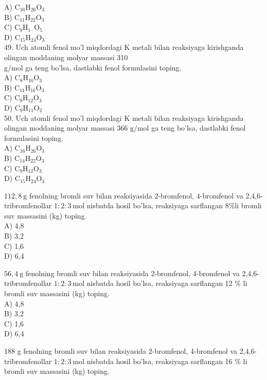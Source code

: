 A) $\mathrm{C}_{16} \mathrm{H}_{26} \mathrm{O}_{3}$\\
B) $\mathrm{C}_{11} \mathrm{H}_{22} \mathrm{O}_{3}$\\
C) $\mathrm{C}_{9} \mathrm{H}_{1 \cdot} \mathrm{O}_{5}$\\
D) $\mathrm{C}_{15} \mathrm{H}_{24} \mathrm{O}_{3}$\\
49. Uch atomli fenol mo'l miqdordagi K metali bilan reaksiyaga kirishganda olingan moddaning molyar massasi 310\\
g/mol ga teng bo'lsa, dastlabki fenol formulasini toping.\\
A) $\mathrm{C}_{8} \mathrm{H}_{10} \mathrm{O}_{3}$\\
B) $\mathrm{C}_{11} \mathrm{H}_{16} \mathrm{O}_{3}$\\
C) $\mathrm{C}_{9} \mathrm{H}_{12} \mathrm{O}_{3}$\\
D) $\mathrm{C}_{9} \mathrm{H}_{11} \mathrm{O}_{2}$\\
50. Uch atomli fenol mo'l miqdordagi K metali bilan reaksiyaga kirishganda olingan moddaning molyar massasi 366 $\mathrm{g} / \mathrm{mol}$ ga teng bo'lsa, dastlabki fenol formulasini toping.\\
A) $\mathrm{C}_{16} \mathrm{H}_{26} \mathrm{O}_{3}$\\
B) $\mathrm{C}_{14} \mathrm{H}_{22} \mathrm{O}_{3}$\\
C) $\mathrm{C}_{9} \mathrm{H}_{12} \mathrm{O}_{3}$\\
D) $\mathrm{C}_{15} \mathrm{H}_{24} \mathrm{O}_{3}$
  \item $112,8 \mathrm{~g}$ fenolning bromli suv bilan reaksiyasida 2-bromfenol, 4-bromfenol va 2,4,6-tribromfenollar $1: 2: 3 \mathrm{~mol}$ nisbatda hosil bo'lsa, reaksiyaga sarflangan $8 \% \mathrm{li}$ bromli suv massasini (kg) toping.\\
A) 4,8\\
B) 3,2\\
C) 1,6\\
D) 6,4
  \item $56,4 \mathrm{~g}$ fenolning bromli suv bilan reaksiyasida 2-bromfenol, 4-bromfenol va 2,4,6-tribromfenollar $1: 2: 3 \mathrm{~mol}$ nisbatda hosil bo'lsa, reaksiyaga sarflangan 12 \% li bromli suv massasini (kg) toping.\\
A) 4,8\\
B) 3,2\\
C) 1,6\\
D) 6,4
  \item 188 g fenolning bromli suv bilan reaksiyasida 2-bromfenol, 4-bromfenol va 2,4,6-tribromfenollar $1: 2: 3 \mathrm{~mol}$ nisbatda hosil bo'lsa, reaksiyaga sarflangan 16 \% li bromli suv massasini (kg) toping.\\
